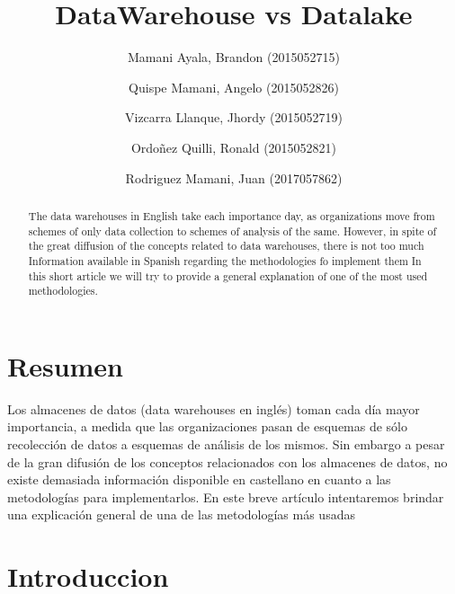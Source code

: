 \documentclass[preprint,12pt]{elsarticle}
\begin{document}
	
	\begin{frontmatter}
		
		
		\title{\huge DataWarehouse vs  Datalake}
		
		\author{Mamani Ayala, Brandon        (2015052715)}
		\author{Quispe Mamani, Angelo	      (2015052826)}
		\author{Vizcarra Llanque, Jhordy	      (2015052719)}
		\author{Ordoñez Quilli, Ronald          (2015052821)}
		\author{Rodriguez Mamani, Juan      (2017057862)}
		
		\address{Tacna, Perú}
		
		\begin{abstract}
			
The data warehouses in English take each importance day, as organizations move from schemes of only data collection to schemes of analysis of the same. However, in spite of the great diffusion of the concepts related to data warehouses, there is not too much Information available in Spanish regarding the methodologies fo implement them In this short article we will try to provide a general explanation of one of the most used methodologies. 
		\end{abstract}
\end{frontmatter}

	
	
	\section{Resumen}
Los almacenes de datos (data warehouses en inglés) toman cada día mayor importancia, a medida que las organizaciones pasan de esquemas de sólo recolección de datos a esquemas de análisis de los mismos. Sin embargo a pesar de la gran difusión de los conceptos relacionados con los almacenes de datos, no existe demasiada información disponible en castellano en cuanto a las metodologías para implementarlos. En este breve artículo intentaremos brindar una explicación general de una de las metodologías más usadas \\
	
	



	
	
\section{Introduccion}
\end{document}
